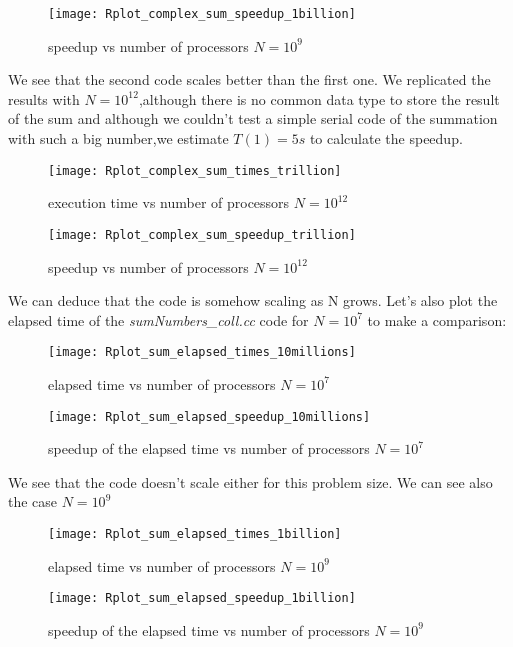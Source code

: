 \documentclass[11pt]{scrartcl} %
\begin{document}
\begin{figure}[H] %
	\centering
	\texttt{[image: Rplot\_complex\_sum\_speedup\_1billion]} %
	\caption{speedup vs number of processors $N= 10^9$}
\end{figure}
We see that the second code scales better than the first one.
We replicated the results with $N=10^{12}$,although there is no common data type to store the result of the sum and although we couldn't test a simple serial code of the summation with such a big number,we estimate $T(1) = 5 s$ to calculate the speedup.
\begin{figure}[H] %
	\centering
	\texttt{[image: Rplot\_complex\_sum\_times\_trillion]} %
	\caption{execution time vs number of processors $N= 10^{12}$}
\end{figure}
\begin{figure}[H] %
	\centering
	\texttt{[image: Rplot\_complex\_sum\_speedup\_trillion]} %
	\caption{speedup vs number of processors $N= 10^{12}$}
\end{figure}
We can deduce that the code is somehow scaling as N grows.
Let's also plot the elapsed time of the \textit{sumNumbers\_coll.cc} code for $N=10^7$ to make a comparison:

\begin{figure}[H] %
	\centering
	\texttt{[image: Rplot\_sum\_elapsed\_times\_10millions]} %
	\caption{elapsed time vs number of processors $N= 10^7$}
\end{figure}
\begin{figure}[H] %
	\centering
	\texttt{[image: Rplot\_sum\_elapsed\_speedup\_10millions]} %
	\caption{speedup of the elapsed time vs number of processors $N= 10^7$}
\end{figure}
We see that the code doesn't scale either for this problem size. We can see also the case $N=10^9$
\begin{figure}[H] %
	\centering
	\texttt{[image: Rplot\_sum\_elapsed\_times\_1billion]} %
	\caption{elapsed time vs number of processors $N= 10^9$}
\end{figure}
\begin{figure}[H] %
	\centering
	\texttt{[image: Rplot\_sum\_elapsed\_speedup\_1billion]} %
	\caption{speedup of the elapsed time vs number of processors $N= 10^9$}
\end{figure}
\end{document}
